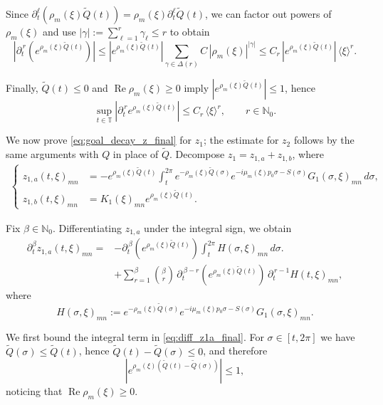 \documentclass[11pt,reqno]{amsart}
\numberwithin{equation}{section}
\begin{document}
	Since $\partial_t^\ell(\rho_m(\xi)\widetilde Q(t))=\rho_m(\xi)\partial_t^\ell\widetilde Q(t)$, we can factor out
	powers of $\rho_m(\xi)$ and use $|\gamma|:=\sum_{\ell=1}^r\gamma_\ell\le r$ to obtain
	\[
	\left|\partial_t^{\,r}\!\left(e^{\rho_m(\xi)\widetilde Q(t)}\right)\right|
	\le
	|e^{\rho_m(\xi)\widetilde Q(t)}|
	\sum_{\gamma\in\Delta(r)} C\,|\rho_m(\xi)|^{|\gamma|}
	\le
	C_r\,|e^{\rho_m(\xi)\widetilde Q(t)}|\,\langle\xi\rangle^{r}.
	\]
	
	Finally, $\widetilde Q(t)\le0$ and $\operatorname{Re}\rho_m(\xi)\ge0$ imply $|e^{\rho_m(\xi)\widetilde Q(t)}|\le1$, hence
	\begin{equation}\label{eq:exp_rhoQ_growth_final}
		\sup_{t\in\mathbb{T}}\left|\partial_t^{\,r} e^{\rho_m(\xi)\widetilde Q(t)}\right|
		\le C_r\,\langle\xi\rangle^{r},
		\qquad r\in\mathbb{N}_0.
	\end{equation}
	
	\smallskip
	
	We now prove \eqref{eq:goal_decay_z_final} for $z_1$; the estimate for $z_2$ follows by the same arguments with
	$Q$ in place of $\widetilde Q$. Decompose $z_1=z_{1,a}+z_{1,b}$, where
	\begin{align*}
		\begin{cases}
			z_{1,a}(t,\xi)_{mn} & = -e^{\rho_m(\xi)\widetilde Q(t)}
			\int_t^{2\pi} e^{-\rho_m(\xi)\widetilde Q(\sigma)} e^{-i\mu_m(\xi) p_0 \sigma-S(\sigma)}G_1(\sigma,\xi)_{mn}\,d\sigma,
			\\[1mm]
			z_{1,b}(t,\xi)_{mn} & = K_1(\xi)_{mn} e^{\rho_m(\xi) \widetilde  {Q}(t)}.
		\end{cases}
	\end{align*}
	
	Fix $\beta\in\mathbb{N}_0$. Differentiating $z_{1,a}$ under the integral sign, we obtain
	\begin{align}
		\partial_t^\beta z_{1,a}(t,\xi)_{mn}
		= &
		-\partial_t^{\,\beta}\!\left(e^{\rho_m(\xi)\widetilde Q(t)}\right)
		\int_t^{2\pi} H(\sigma,\xi)_{mn}\,d\sigma  \label{eq:diff_z1a_final}.\\
		& +\sum_{r=1}^{\beta}\binom{\beta}{r}\,
		\partial_t^{\,\beta-r}\!\left(e^{\rho_m(\xi)\widetilde Q(t)}\right)\,
		\partial_t^{\,r-1}H(t,\xi)_{mn},\label{eq:diff_z1a_final2} \nonumber
	\end{align}
	where
	\[
	H(\sigma,\xi)_{mn}:=
	e^{-\rho_m(\xi)\widetilde Q(\sigma)}e^{-i\mu_m(\xi)p_0\sigma-S(\sigma)}G_1(\sigma,\xi)_{mn}.
	\]
	
	We first bound the integral term in \eqref{eq:diff_z1a_final}. For $\sigma\in[t,2\pi]$ we have
	$\widetilde Q(\sigma)\le \widetilde Q(t)$, hence $\widetilde Q(t)-\widetilde Q(\sigma)\le0$, and therefore
	\[
	\left|e^{\rho_m(\xi)(\widetilde Q(t)-\widetilde Q(\sigma))}\right|
	\le 1,
	\]
	noticing that $\operatorname{Re}\rho_m(\xi)\geq 0$.
	
\end{document}
